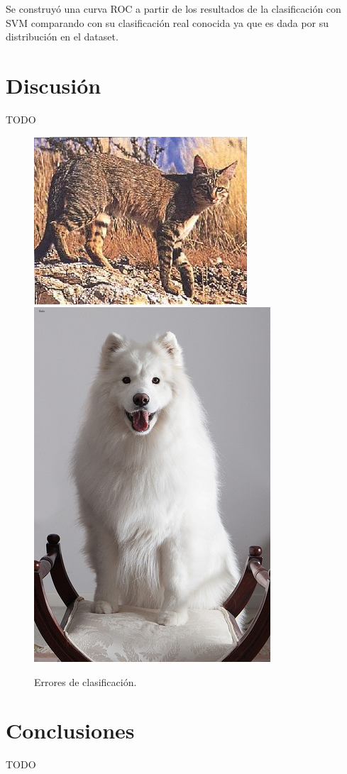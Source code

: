\documentclass[12pt]{article}
\begin{document}
Se construyó una curva ROC a partir de los resultados de la clasificación con SVM comparando con su clasificación real conocida ya que es dada por su distribución en el dataset.

\section{Discusión}

TODO

\begin{figure}[H]
    \centering
{\includegraphics[scale=0.5]{../no-dogs/eval/96.jpg}}
{\includegraphics[scale=0.8]{../dogs/eval/14.jpg}}
    \caption{Errores de clasificación.}
\end{figure}

\section{Conclusiones}
TODO




\end{document}
